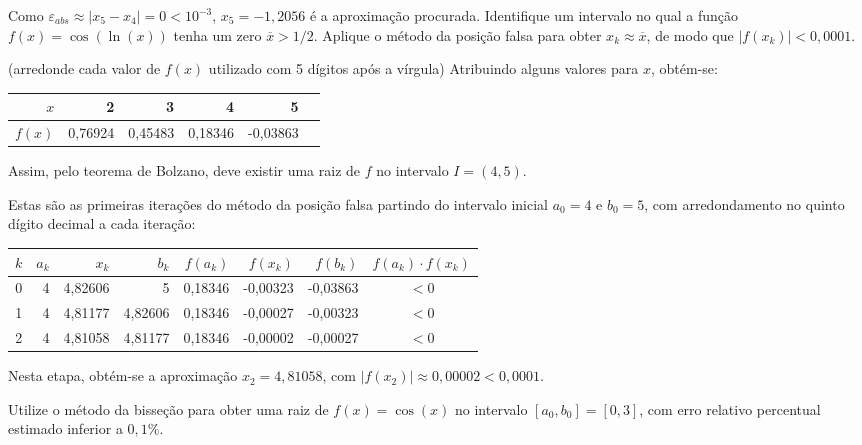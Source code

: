\documentclass[12pt,a4paper]{article}
\begin{document}
\begin{ExerciseList}
Como $\varepsilon_{abs} \approx |x_5 - x_4| = 0 < 10^{-3}$, $x_5 = -1,2056$ é a aproximação procurada.
\color{black}
\Exercise[title={2,5}] Identifique um intervalo no qual a função $f(x) = \cos(\ln(x))$ tenha um zero $\overline{x} > 1/2$. Aplique o método da posição falsa para obter $x_k \approx \overline{x}$, de modo que $|f(x_k)| < 0,0001$.

(arredonde cada valor de $f(x)$ utilizado com 5 dígitos após a vírgula)
\Answer Atribuindo alguns valores para $x$, obtém-se:
\begin{center}
\begin{tabular}{|r|r|r|r|r|r|}
\hline
$x$    & 2   & 3   & 4    &  5 \\
\hline
$f(x)$ & 0,76924 & 0,45483 & 0,18346 & -0,03863 \\
\hline
\end{tabular}
\end{center}
Assim, pelo teorema de Bolzano, deve existir uma raiz de $f$ no intervalo $I = (4, 5)$.

Estas são as primeiras iterações do método da posição falsa partindo do intervalo inicial $a_0 = 4$ e $b_0 = 5$, com arredondamento no quinto dígito decimal a cada iteração:
\begin{center}
\begin{tabular}{rrrrrrrc}
\hline
$k$ & $a_k$ & $x_k$ & $b_k$ & $f(a_k)$ & $f(x_k)$ & $f(b_k)$ & $f(a_k)\cdot f(x_k)$ \\
\hline
0 & 4 & 4,82606 & 5 & 0,18346 & -0,00323 & -0,03863 & $<0$ \\
1 & 4 & 4,81177 & 4,82606 & 0,18346 & -0,00027 & -0,00323 & $<0$ \\
2 & 4 & 4,81058 & 4,81177 & 0,18346 & -0,00002 & -0,00027 & $<0$ \\\hline
\end{tabular}
\end{center}
\medskip
Nesta etapa, obtém-se a aproximação $x_2 = 4,81058$, com $|f(x_2)| \approx 0,00002 < 0,0001$.


\Exercise[title={2,5}] Utilize o método da bisseção para obter uma raiz de $f(x) = \cos(x)$ no intervalo $[a_0, b_0] = [0, 3]$, com erro relativo percentual estimado inferior a $0,1\%$.


\end{ExerciseList}
\end{document}
